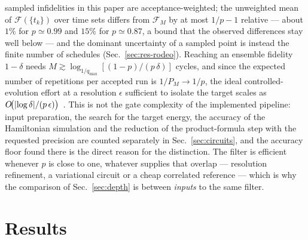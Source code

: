 \documentclass[
  aps,            %
  prc,            %
  reprint,        %
  superscriptaddress,
  floatfix,
  nofootinbib
]{revtex4-2}
\begin{document}
sampled infidelities in this paper are acceptance-weighted; the unweighted
mean of $\mathcal F(\{t_k\})$ over time sets differs from $\mathcal F_M$ by at
most $1/p-1$ relative --- about $1\%$ for $p\simeq0.99$ and $15\%$ for
$p\simeq0.87$, a bound that the observed differences stay well below --- and
the dominant uncertainty of a sampled point is instead the finite number of
schedules (Sec.~\ref{sec:res-rodeo}).  Reaching an ensemble fidelity $1-\delta$ needs
$M\gtrsim\log_{1/q_{\max}}[(1-p)/(p\,\delta)]$ cycles, and since the expected
number of repetitions per accepted run is $1/P_M\to1/p$, the ideal
controlled-evolution effort at a resolution $\epsilon$ sufficient to isolate
the target scales as $O\!\big(\abs{\log\delta}/(p\,\epsilon)\big)$~\cite{Choi2021}.
This is not the gate complexity of the implemented pipeline: input
preparation, the search for the target energy, the accuracy of the
Hamiltonian simulation and the reduction of the product-formula step with the
requested precision are counted separately in Sec.~\ref{sec:circuits}, and
the accuracy floor found there is the direct reason for the distinction.  The filter is efficient
whenever $p$ is close to one, whatever supplies that overlap --- resolution
refinement, a variational circuit or a cheap correlated reference --- which is
why the comparison of Sec.~\ref{sec:depth} is between \emph{inputs} to the
same filter.

\section{Results}
\label{sec:results}
\end{document}
